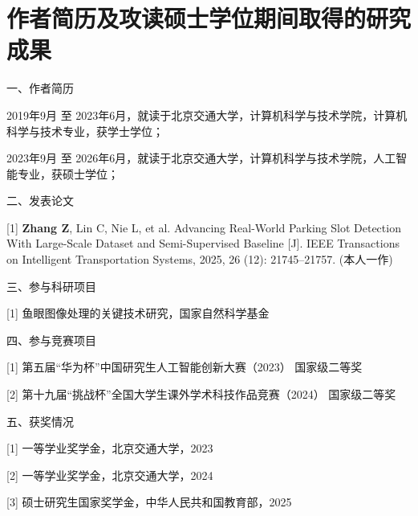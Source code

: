  \setlength{\baselineskip}{16pt}
\chapter{作者简历及攻读硕士学位期间取得的研究成果}
\setlength{\parindent}{0pt}


一、作者简历


2019年9月 至 2023年6月，就读于北京交通大学，计算机科学与技术学院，计算机科学与技术专业，获学士学位；

2023年9月 至 2026年6月，就读于北京交通大学，计算机科学与技术学院，人工智能专业，获硕士学位；


\vspace{10pt}
二、发表论文

[1] \textbf{Zhang Z}, Lin C, Nie L, et al. Advancing Real-World Parking Slot Detection With Large-Scale
Dataset and Semi-Supervised Baseline [J]. IEEE Transactions on Intelligent Transportation Systems, 2025, 26 (12): 21745–21757. (本人一作)


\vspace{10pt}
三、参与科研项目

[1] 鱼眼图像处理的关键技术研究，国家自然科学基金



\vspace{10pt}
四、参与竞赛项目

[1] 第五届“华为杯”中国研究生人工智能创新大赛（2023）   国家级二等奖

[2] 第十九届“挑战杯”全国大学生课外学术科技作品竞赛（2024）   国家级二等奖



\vspace{10pt}
五、获奖情况

   [1] 一等学业奖学金，北京交通大学，2023
   
   [2] 一等学业奖学金，北京交通大学，2024

   [3] 硕士研究生国家奖学金，中华人民共和国教育部，2025

